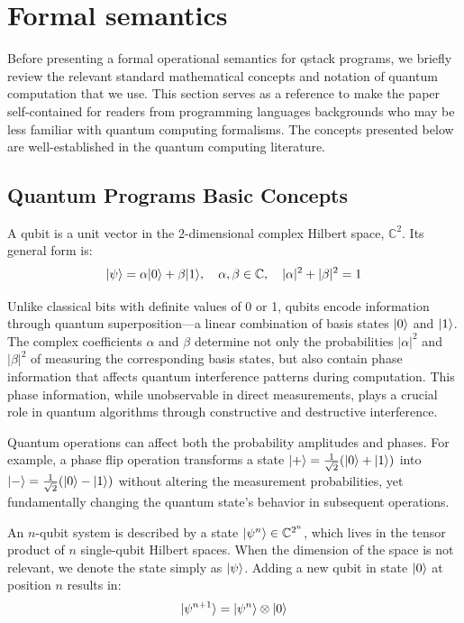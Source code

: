 \section{Formal semantics}\label{sec:formal}

\newcommand{\keval}{\Rightarrow }
\newcommand{\qeval}{\mapsto_q }
\newcommand{\ceval}{\mapsto_c }

Before presenting a formal operational semantics for qstack programs, we briefly review the relevant standard mathematical concepts and notation of quantum computation that we use. This section serves as a reference to make the paper self-contained for readers from programming languages backgrounds who may be less familiar with quantum computing formalisms. The concepts presented below are well-established in the quantum computing literature.

\subsection{Quantum Programs Basic Concepts}

A qubit is a unit vector in the 2-dimensional complex Hilbert space, $\mathbb{C}^2$. Its general form is:
\[
|\psi\rangle = \alpha|0\rangle + \beta|1\rangle, \quad \alpha, \beta \in \mathbb{C}, \quad |\alpha|^2 + |\beta|^2 = 1
\]

Unlike classical bits with definite values of 0 or 1, qubits encode information through quantum superposition—a linear combination of basis states $|0\rangle$ and $|1\rangle$. The complex coefficients $\alpha$ and $\beta$ determine not only the probabilities $|\alpha|^2$ and $|\beta|^2$ of measuring the corresponding basis states, but also contain phase information that affects quantum interference patterns during computation. This phase information, while unobservable in direct measurements, plays a crucial role in quantum algorithms through constructive and destructive interference.

Quantum operations can affect both the probability amplitudes and phases. For example, a phase flip operation transforms a state $|+\rangle = \frac{1}{\sqrt{2}}(|0\rangle + |1\rangle)$ into $|-\rangle = \frac{1}{\sqrt{2}}(|0\rangle - |1\rangle)$ without altering the measurement probabilities, yet fundamentally changing the quantum state's behavior in subsequent operations.

An $n$-qubit system is described by a state $|\psi^n\rangle \in \mathbb{C}^{2^n}$, which lives in the tensor product of $n$ single-qubit Hilbert spaces. When the dimension of the space is not relevant, we denote the state simply as $|\psi\rangle$. Adding a new qubit in state $|0\rangle$ at position $n$ results in:
\[
|\psi^{n+1}\rangle = |\psi^n\rangle \otimes |0\rangle
\]

